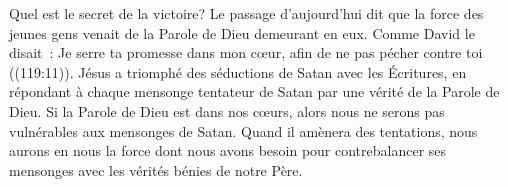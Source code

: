 Quel est le secret de la victoire? Le passage d'aujourd'hui dit que la force
 des jeunes gens venait de la Parole de Dieu demeurant en eux.
 Comme David le disait~: 
 \og Je serre ta promesse dans mon cœur, afin de ne pas pécher contre toi \fg{}
 ((119:11)).
 Jésus a triomphé des séductions de Satan avec les Écritures, en répondant
 à chaque mensonge tentateur de Satan par une vérité de la Parole de Dieu.
 Si la Parole de Dieu est dans nos c\oe{}urs, alors nous ne serons pas
 vulnérables aux mensonges de Satan.
 Quand il amènera des tentations, nous aurons en nous la force dont nous
 avons besoin pour contrebalancer ses mensonges avec les vérités bénies 
 de notre Père.


\dvrule


